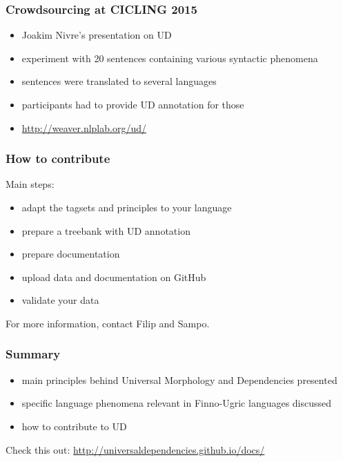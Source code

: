 \documentclass{beamer}
\begin{document}
\begin{frame}
\frametitle{Crowdsourcing at CICLING 2015}
\begin{itemize}
\item Joakim Nivre's presentation on UD
\item experiment with 20 sentences containing various syntactic phenomena
\item sentences were translated to several languages
\item participants had to provide UD annotation for those
\item \url{http://weaver.nlplab.org/ud/}
\end{itemize}
\end{frame}

\begin{frame}
\frametitle{How to contribute}
Main steps:
\begin{itemize}
\item adapt the tagsets and principles to your language
\item prepare a treebank with UD annotation
\item prepare documentation
\item upload data and documentation on GitHub
\item validate your data
\end{itemize}
For more information, contact Filip and Sampo.
\end{frame}

\begin{frame}
\frametitle{Summary}
\begin{itemize}
\item main principles behind Universal Morphology and Dependencies presented
\item specific language phenomena relevant in Finno-Ugric languages discussed
\item how to contribute to UD
\end{itemize}

Check this out:
\url{http://universaldependencies.github.io/docs/}
\end{frame}

\begin{frame}[allowframebreaks]
\tiny


\end{frame}
\end{document}
